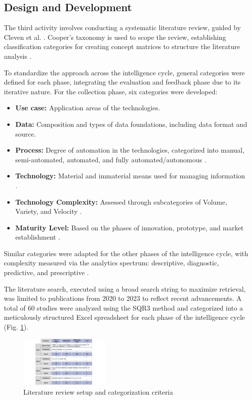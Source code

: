 \documentclass[10pt]{article}
\begin{document}
\subsection{Design and Development}
The third activity involves conducting a systematic literature review, guided by Cleven et al. \cite{Cleven.2009}. Cooper's taxonomy \cite{Cooper.1988} is used to scope the review, establishing classification categories for creating concept matrices to structure the literature analysis \cite{Webster.2002}.

To standardize the approach across the intelligence cycle, general categories were defined for each phase, integrating the evaluation and feedback phase due to its iterative nature. For the collection phase, six categories were developed:
\begin{itemize}
    \item \textbf{Use case:} Application areas of the technologies.
    \item \textbf{Data:} Composition and types of data foundations, including data format and source.
    \item \textbf{Process:} Degree of automation in the technologies, categorized into manual, semi-automated, automated, and fully automated/autonomous \cite{Duncheon.2002, Billings.1997, Endsley.1999}.
    \item \textbf{Technology:} Material and immaterial means used for managing information \cite{Bleck.2004}.
    \item \textbf{Technology Complexity:} Assessed through subcategories of Volume, Variety, and Velocity \cite{Elgendy.2014, Singh.2012}.
    \item \textbf{Maturity Level:} Based on the phases of innovation, prototype, and market establishment \cite{Stich.2022}.
\end{itemize}

Similar categories were adapted for the other phases of the intelligence cycle, with complexity measured via the analytics spectrum: descriptive, diagnostic, predictive, and prescriptive \cite{Delen.2013}.

The literature search, executed using a broad search string to maximize retrieval, was limited to publications from 2020 to 2023 to reflect recent advancements. A total of 60 studies were analyzed using the SQR3 method \cite{Robinson.1970} and categorized into a meticulously structured Excel spreadsheet for each phase of the intelligence cycle (Fig. \ref{fig:LiteratureReview}).

\begin{figure}[t]
    \centering
    \includegraphics[width=0.4\textwidth]{PDF/images/crop_Kategorisierungskriterien und Literraturreviewaufbau}
    \caption{Literature review setup and categorization criteria}
    \label{fig:LiteratureReview}
\end{figure}
\end{document}
